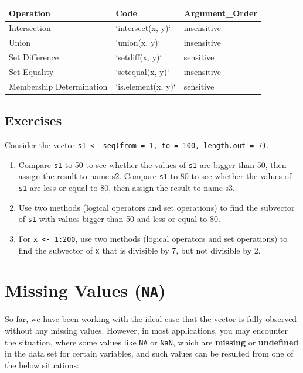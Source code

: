 \documentclass[
]{book}
\begin{document}
\begin{tabular}{l|l|l}
\hline
Operation & Code & Argument\_Order\\
\hline
Intersection & `intersect(x, y)` & insensitive\\
\hline
Union & `union(x, y)` & insensitive\\
\hline
Set Difference & `setdiff(x, y)` & sensitive\\
\hline
Set Equality & `setequal(x, y)` & insensitive\\
\hline
Membership Determination & `is.element(x, y)` & sensitive\\
\hline
\end{tabular}

\hypertarget{exercises-16}{%
\subsection{Exercises}\label{exercises-16}}

Consider the vector \texttt{s1\ \textless{}-\ seq(from\ =\ 1,\ to\ =\ 100,\ length.out\ =\ 7)}.

\begin{enumerate}
\def\labelenumi{\arabic{enumi}.}
\item
  Compare \texttt{s1} to 50 to see whether the values of \texttt{s1} are bigger than 50, then assign the result to name s2. Compare \texttt{s1} to 80 to see whether the values of \texttt{s1} are less or equal to 80, then assign the result to name s3.
\item
  Use two methods (logical operators and set operations) to find the subvector of \texttt{s1} with values bigger than 50 and less or equal to 80.
\item
  For \texttt{x\ \textless{}-\ 1:200}, use two methods (logical operators and set operations) to find the subvector of \texttt{x} that is divisible by 7, but not divisible by 2.
\end{enumerate}

\hypertarget{missing-values}{%
\section{\texorpdfstring{Missing Values (\texttt{NA})}{Missing Values (NA)}}\label{missing-values}}

So far, we have been working with the ideal case that the vector is fully observed without any missing values. However, in most applications, you may encounter the situation, where some values like \texttt{NA} or \texttt{NaN}, which are \textbf{missing} or \textbf{undefined} in the data set for certain variables, and such values can be resulted from one of the below situations:
\end{document}
